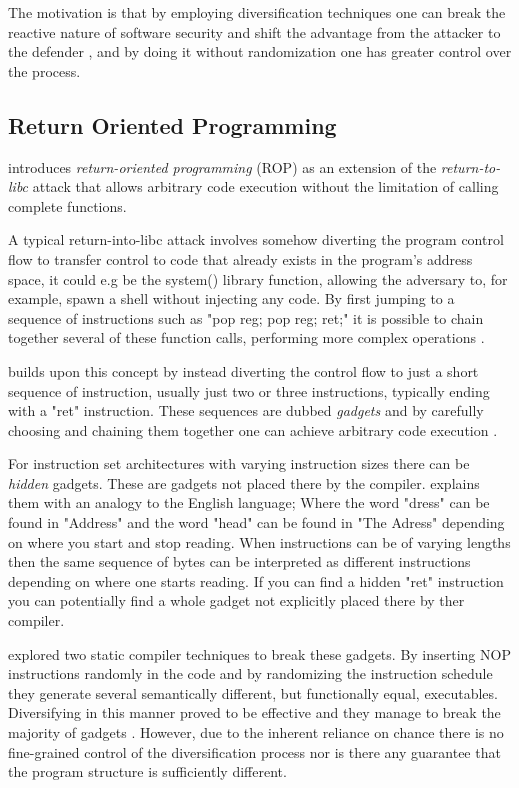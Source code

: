The motivation is that by employing diversification techniques one can break the
reactive nature of software security and shift the advantage from the attacker to the
defender \cite{compiler-generated-sw-div}, and by doing it without randomization one has
greater control over the process.

\subsection{Return Oriented Programming}
\label{rop}

\textcite{rop} introduces \textit{return-oriented programming} (ROP) as an extension of
the \textit{return-to-libc}\cite{return-into-libc} attack that allows arbitrary code
execution without the limitation of calling complete functions.

A typical return-into-libc attack involves somehow diverting the program control
flow to transfer control to code that already exists in the program's address space,
it could e.g be the system() library function, allowing the adversary to, for example, spawn
a shell without injecting any code. By first jumping to a sequence of instructions such as
"pop reg; pop reg; ret;" it is possible to chain together several of these function calls,
performing more complex operations \cite{non-exec-stack,advanced-return-into-libc}.

\textcite{rop} builds upon this concept by instead diverting the control flow to just a short
sequence of instruction, usually just two or three instructions, typically ending with a
"ret" instruction. These sequences are dubbed \textit{gadgets} and by carefully choosing
and chaining them together one can achieve arbitrary code execution \cite{rop}.

For instruction set architectures with varying instruction sizes there can be
\textit{hidden} gadgets. These are gadgets not placed there by the compiler. \textcite{rop}
explains them with an analogy to the English language; Where the word "dress" can be found
in "Address" and the word "head" can be found in "The Adress" depending on where you start
and stop reading. When instructions can be of varying lengths then the same sequence of
bytes can be interpreted as different instructions depending on where one starts reading.
If you can find a hidden "ret" instruction you can potentially find a whole gadget not
explicitly placed there by ther compiler.

\textcite{large-scale-automated} explored two static compiler techniques to break these
gadgets. By inserting NOP instructions randomly in the code and by randomizing the
instruction schedule they generate several semantically different, but functionally equal,
executables. Diversifying in this manner proved to be effective and they manage to break
the majority of gadgets \cite{large-scale-automated}. However, due to the inherent reliance
on chance there is no fine-grained control of the diversification process nor is there
any guarantee that the program structure is sufficiently different.
